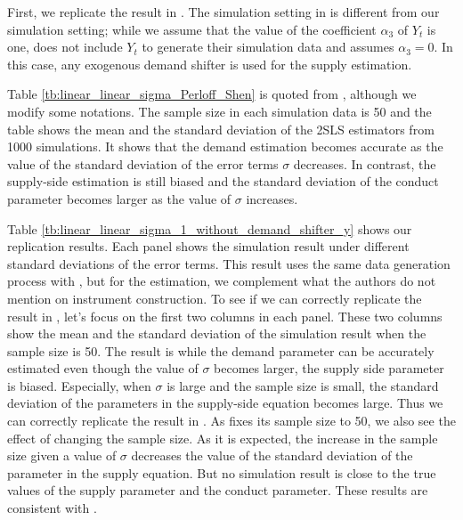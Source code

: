 \documentclass[11pt, a4paper]{article}
\begin{document}
First, we replicate the result in \citet{perloff2012collinearity}.
The simulation setting in \cite{perloff2012collinearity} is different from our simulation setting; while we assume that the value of the coefficient $\alpha_3$ of $Y_t$ is one, \cite{perloff2012collinearity} does not include $Y_t$ to generate their simulation data and assumes $\alpha_3 = 0$.
In this case, any exogenous demand shifter is used for the supply estimation.

Table \ref{tb:linear_linear_sigma_Perloff_Shen} is quoted from \cite{perloff2012collinearity}, although we modify some notations.
The sample size in each simulation data is 50 and the table shows the mean and the standard deviation of the 2SLS estimators from 1000 simulations.
It shows that the demand estimation becomes accurate as the value of the standard deviation of the error terms $\sigma$ decreases.
In contrast, the supply-side estimation is still biased and the standard deviation of the conduct parameter becomes larger as the value of $\sigma$ increases.

Table \ref{tb:linear_linear_sigma_1_without_demand_shifter_y} shows our replication results.
Each panel shows the simulation result under different standard deviations of the error terms.
This result uses the same data generation process with \citet{perloff2012collinearity}, but for the estimation, we complement what the authors do not mention on instrument construction.
To see if we can correctly replicate the result in \cite{perloff2012collinearity}, let's focus on the first two columns in each panel.
These two columns show the mean and the standard deviation of the simulation result when the sample size is 50.
The result is while the demand parameter can be accurately estimated even though the value of $\sigma$ becomes larger, the supply side parameter is biased.
Especially, when $\sigma$ is large and the sample size is small, the standard deviation of the parameters in the supply-side equation becomes large.
Thus we can correctly replicate the result in \citet{perloff2012collinearity}.
As \cite{perloff2012collinearity} fixes its sample size to 50, we also see the effect of changing the sample size.
As it is expected, the increase in the sample size given a value of $\sigma$ decreases the value of the standard deviation of the parameter in the supply equation.
But no simulation result is close to the true values of the supply parameter and the conduct parameter.
These results are consistent with \cite{perloff2012collinearity}.
\end{document}
